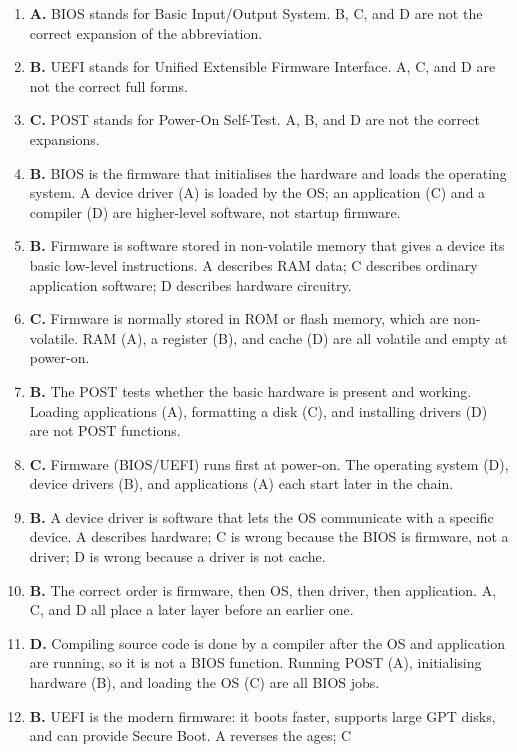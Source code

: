 \begin{enumerate}[label=\textbf{Q\arabic*.}, leftmargin=*]
\item \textbf{A.} BIOS stands for Basic Input/Output System. B, C, and D are
  not the correct expansion of the abbreviation.
\item \textbf{B.} UEFI stands for Unified Extensible Firmware Interface. A, C,
  and D are not the correct full forms.
\item \textbf{C.} POST stands for Power-On Self-Test. A, B, and D are not the
  correct expansions.
\item \textbf{B.} BIOS is the firmware that initialises the hardware and
  loads the operating system. A device driver (A) is loaded by the OS; an
  application (C) and a compiler (D) are higher-level software, not startup
  firmware.
\item \textbf{B.} Firmware is software stored in non-volatile memory that
  gives a device its basic low-level instructions. A describes RAM data; C
  describes ordinary application software; D describes hardware circuitry.
\item \textbf{C.} Firmware is normally stored in ROM or flash memory, which
  are non-volatile. RAM (A), a register (B), and cache (D) are all volatile
  and empty at power-on.
\item \textbf{B.} The POST tests whether the basic hardware is present and
  working. Loading applications (A), formatting a disk (C), and installing
  drivers (D) are not POST functions.
\item \textbf{C.} Firmware (BIOS/UEFI) runs first at power-on. The operating
  system (D), device drivers (B), and applications (A) each start later in
  the chain.
\item \textbf{B.} A device driver is software that lets the OS communicate
  with a specific device. A describes hardware; C is wrong because the BIOS
  is firmware, not a driver; D is wrong because a driver is not cache.
\item \textbf{B.} The correct order is firmware, then OS, then driver, then
  application. A, C, and D all place a later layer before an earlier one.
\item \textbf{D.} Compiling source code is done by a compiler after the OS
  and application are running, so it is not a BIOS function. Running POST
  (A), initialising hardware (B), and loading the OS (C) are all BIOS jobs.
\item \textbf{B.} UEFI is the modern firmware: it boots faster, supports
  large GPT disks, and can provide Secure Boot. A reverses the ages; C

\end{enumerate}
